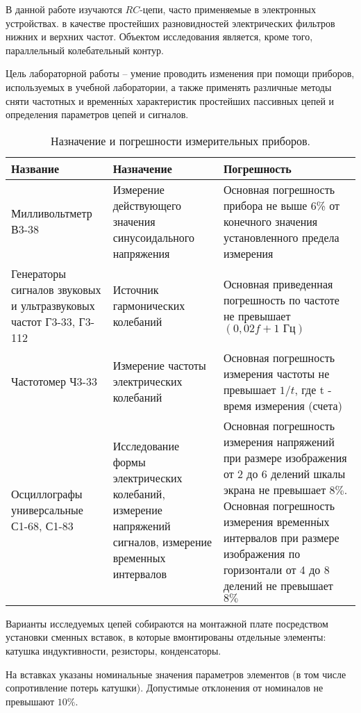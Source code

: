 \documentclass[a4paper,12pt]{report}
\begin{document}
	В данной работе изучаются $RC$-цепи, часто применяемые в электронных устройствах. в качестве простейших разновидностей электрических фильтров нижних и верхних частот. Объектом исследования является, кроме того, параллельный колебательный контур.
	
	Цель лабораторной работы -- умение проводить изменения при помощи приборов, используемых в учебной лаборатории, а также применять различные методы сняти частотных и временн$\acute{\text{ы}}$х характеристик простейших пассивных цепей и определения параметров цепей и сигналов.
\begin{table}[h!]
  \begin{center}
    \caption{Назначение и погрешности измерительных приборов.}
    \label{tab:table1}
    \begin{tabular}{| m{12em} | m{12em} | m{14em} |}
    \hline
     Название & Назначение & Погрешность \\
      \hline
      Милливольтметр В3-38 & Измерение действующего значения синусоидального напряжения & Основная погрешность прибора не выше 6\% от конечного значения установленного предела измерения\\
      \hline
      Генераторы сигналов звуковых и ультразвуковых частот Г3-33, Г3-112 & Источник гармонических колебаний & Основная приведенная погрешность по частоте не превышает $(0,02f+1\text{ Гц})$\\
      \hline
      Частотомер Ч3-33 & Измерение частоты электрических колебаний & Основная погрешность измерения частоты не превышает $1/t$, где t - время измерения (счета)\\
      \hline
      Осциллографы универсальные С1-68, С1-83 & Исследование формы электрических колебаний, измерение напряжений сигналов, измерение временных интервалов & Основная погрешность измерения напряжений при размере изображения от 2 до 6 делений шкалы экрана не превышает $8\%$. Основная погрешность измерения временн$\acute{\text{ы}}$х интервалов при размере изображения по горизонтали от 4 до 8 делений не превышает $8\%$\\
      \hline
    \end{tabular}
  \end{center}
\end{table}

	Варианты исследуемых цепей собираются на монтажной плате посредством установки сменных вставок, в которые вмонтированы отдельные элементы: катушка индуктивности, резисторы, конденсаторы.
	
	На вставках указаны номинальные значения параметров элементов (в том числе сопротивление потерь катушки). Допустимые отклонения от номиналов не превышают $10\%$.
	
\end{document}
